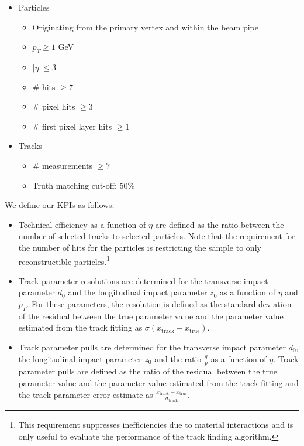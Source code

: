 \documentclass[10pt, paper=a4, UKenglish]{article}
\begin{document}
\begin{itemize}
  \item Particles
    \begin{itemize}
      \item Originating from the primary vertex and within the beam pipe
      \item $p_T \ge 1$ GeV
      \item $|\eta| \le 3$
      \item \# hits $\geq 7$
      \item \# pixel hits $\geq 3$
      \item \# first pixel layer hits $\geq 1$
    \end{itemize}
  \item Tracks
    \begin{itemize}
      \item \# measurements $\geq 7$
      \item Truth matching cut-off: 50\%
    \end{itemize}
\end{itemize}

\begin{flushleft}
We define our KPIs as follows:
\end{flushleft}

\begin{itemize}
  \item Technical efficiency as a function of $\eta$ are defined as the ratio between the number of selected tracks to selected particles. Note that the requirement for the number of hits for the particles is restricting the sample to only reconstructible particles.\footnote{This requirement suppresses inefficiencies due to material interactions and is only useful to evaluate the performance of the track finding algorithm.}
  \item Track parameter resolutions are determined for the transverse impact parameter $d_0$ and the longitudinal impact parameter $z_0$ as a function of $\eta$ and $p_T$. For these parameters, the resolution is defined as the standard deviation of the residual between the true parameter value and the parameter value estimated from the track fitting as $\sigma(x_{\text{track}}-x_{\text{true}})$.
  \item Track parameter pulls are determined for the transverse impact parameter $d_0$, the longitudinal impact parameter $z_0$ and the ratio $\frac{q}{p}$ as a function of $\eta$. Track parameter pulls are defined as the ratio of the residual between the true parameter value and the parameter value estimated from the track fitting and the track parameter error estimate as $\frac{x_{\text{track}}-x_{\text{true}}}{\sigma_{\text{track}}}$.
\end{itemize}
\end{document}
